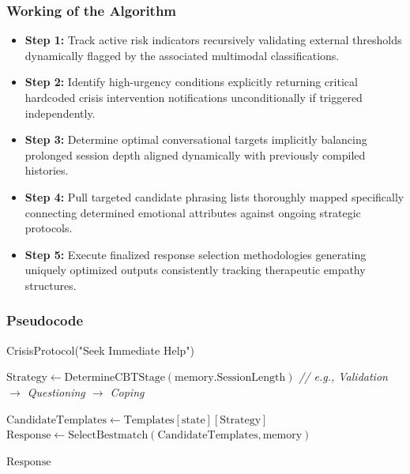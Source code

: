 \documentclass[11pt]{report}
\begin{document}
\subsubsection*{Working of the Algorithm}
\begin{itemize}
    \item \textbf{Step 1:} Track active risk indicators recursively validating external thresholds dynamically flagged by the associated multimodal classifications. 
    \item \textbf{Step 2:} Identify high-urgency conditions explicitly returning critical hardcoded crisis intervention notifications unconditionally if triggered independently.
    \item \textbf{Step 3:} Determine optimal conversational targets implicitly balancing prolonged session depth aligned dynamically with previously compiled histories.
    \item \textbf{Step 4:} Pull targeted candidate phrasing lists thoroughly mapped specifically connecting determined emotional attributes against ongoing strategic protocols.
    \item \textbf{Step 5:} Execute finalized response selection methodologies generating uniquely optimized outputs consistently tracking therapeutic empathy structures.
\end{itemize}

\subsubsection*{Pseudocode}
\begin{algorithm}[H]
\caption{CBT Response generation Algorithm}
\label{alg:cbt_response}
\begin{algorithmic}[1]
        \State \Return CrisisProtocol("Seek Immediate Help")
    \EndIf
    
    \State $\mathrm{Strategy} \gets \mathrm{DetermineCBTStage}(\mathrm{memory.SessionLength})$
    \State \textit{// e.g., Validation $\to$ Questioning $\to$ Coping}
    
    \State $\mathrm{CandidateTemplates} \gets \mathrm{Templates}[\mathrm{state}][\mathrm{Strategy}]$
    \State $\mathrm{Response} \gets \mathrm{SelectBestmatch}(\mathrm{CandidateTemplates}, \mathrm{memory})$
    
    \State \Return $\mathrm{Response}$
\EndProcedure
\end{algorithmic}
\end{algorithm}
\end{document}
